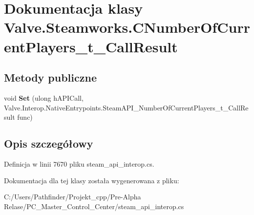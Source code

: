 \hypertarget{class_valve_1_1_steamworks_1_1_c_number_of_current_players__t___call_result}{}\section{Dokumentacja klasy Valve.\+Steamworks.\+C\+Number\+Of\+Current\+Players\+\_\+t\+\_\+\+Call\+Result}
\label{class_valve_1_1_steamworks_1_1_c_number_of_current_players__t___call_result}
\subsection*{Metody publiczne}
\begin{DoxyCompactItemize}
\item 
\mbox{\label{class_valve_1_1_steamworks_1_1_c_number_of_current_players__t___call_result_a741dc47731a3e7f3c20684db53567256}} 
void {\bfseries Set} (ulong h\+A\+P\+I\+Call, Valve.\+Interop.\+Native\+Entrypoints.\+Steam\+A\+P\+I\+\_\+\+Number\+Of\+Current\+Players\+\_\+t\+\_\+\+Call\+Result func)
\end{DoxyCompactItemize}


\subsection{Opis szczegółowy}


Definicja w linii 7670 pliku steam\+\_\+api\+\_\+interop.\+cs.



Dokumentacja dla tej klasy została wygenerowana z pliku\+:\begin{DoxyCompactItemize}
\item 
C\+:/\+Users/\+Pathfinder/\+Projekt\+\_\+cpp/\+Pre-\/\+Alpha Relase/\+P\+C\+\_\+\+Master\+\_\+\+Control\+\_\+\+Center/steam\+\_\+api\+\_\+interop.\+cs\end{DoxyCompactItemize}
